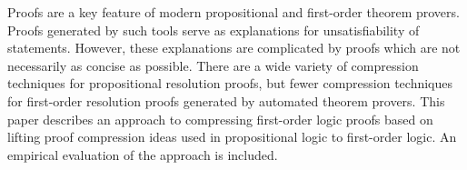 Proofs are a key feature of modern propositional and first-order theorem provers. Proofs generated by such tools serve as explanations for unsatisfiability of statements. However, these explanations are complicated by proofs which are not necessarily as concise as possible.
There are a wide variety of compression techniques for propositional resolution proofs, but fewer compression techniques for first-order resolution proofs generated by automated theorem provers.
This paper describes an approach to compressing first-order logic proofs based on lifting proof compression ideas used in propositional logic to first-order logic. 
An empirical evaluation of the approach is included.
